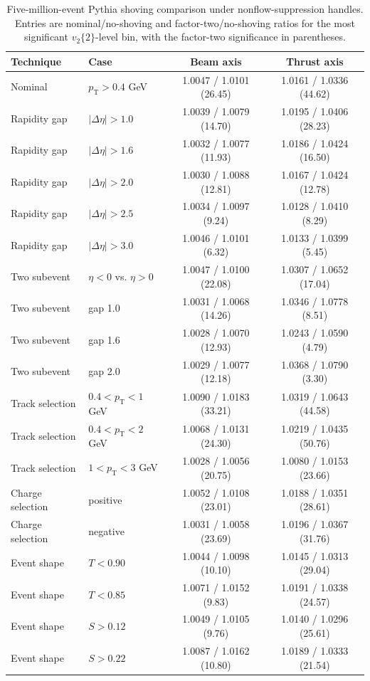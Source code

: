 \documentclass{article}
\newcommand{\pT}{\ensuremath{p_{\mathrm{T}}}}
\newcommand{\vn}[2]{\ensuremath{v_{#1}\{#2\}}}
\begin{document}
\begin{table}[htbp]
\centering
\scriptsize
\caption{Five-million-event Pythia shoving comparison under nonflow-suppression
handles. Entries are nominal/no-shoving and factor-two/no-shoving ratios for the
most significant \(\vn{2}{2}\)-level bin, with the factor-two significance in
parentheses.}
\label{tab:pythia-shoving-nonflow-v22}
\begin{tabular}{llcc}
\toprule
Technique & Case & Beam axis & Thrust axis \\
\midrule
Nominal & \(\pT>0.4\) GeV & 1.0047 / 1.0101 (26.45) & 1.0161 / 1.0336 (44.62) \\
Rapidity gap & \(|\Delta\eta|>1.0\) & 1.0039 / 1.0079 (14.70) & 1.0195 / 1.0406 (28.23) \\
Rapidity gap & \(|\Delta\eta|>1.6\) & 1.0032 / 1.0077 (11.93) & 1.0186 / 1.0424 (16.50) \\
Rapidity gap & \(|\Delta\eta|>2.0\) & 1.0030 / 1.0088 (12.81) & 1.0167 / 1.0424 (12.78) \\
Rapidity gap & \(|\Delta\eta|>2.5\) & 1.0034 / 1.0097 (9.24) & 1.0128 / 1.0410 (8.29) \\
Rapidity gap & \(|\Delta\eta|>3.0\) & 1.0046 / 1.0101 (6.32) & 1.0133 / 1.0399 (5.45) \\
Two subevent & \(\eta<0\) vs. \(\eta>0\) & 1.0047 / 1.0100 (22.08) & 1.0307 / 1.0652 (17.04) \\
Two subevent & gap 1.0 & 1.0031 / 1.0068 (14.26) & 1.0346 / 1.0778 (8.51) \\
Two subevent & gap 1.6 & 1.0028 / 1.0070 (12.93) & 1.0243 / 1.0590 (4.79) \\
Two subevent & gap 2.0 & 1.0029 / 1.0077 (12.18) & 1.0368 / 1.0790 (3.30) \\
Track selection & \(0.4<\pT<1\) GeV & 1.0090 / 1.0183 (33.21) & 1.0319 / 1.0643 (44.58) \\
Track selection & \(0.4<\pT<2\) GeV & 1.0068 / 1.0131 (24.30) & 1.0219 / 1.0435 (50.76) \\
Track selection & \(1<\pT<3\) GeV & 1.0028 / 1.0056 (20.75) & 1.0080 / 1.0153 (23.66) \\
Charge selection & positive & 1.0052 / 1.0108 (23.01) & 1.0188 / 1.0351 (28.61) \\
Charge selection & negative & 1.0031 / 1.0058 (23.69) & 1.0196 / 1.0367 (31.76) \\
Event shape & \(T<0.90\) & 1.0044 / 1.0098 (10.10) & 1.0145 / 1.0313 (29.04) \\
Event shape & \(T<0.85\) & 1.0071 / 1.0152 (9.83) & 1.0191 / 1.0338 (24.57) \\
Event shape & \(S>0.12\) & 1.0049 / 1.0105 (9.76) & 1.0140 / 1.0296 (25.61) \\
Event shape & \(S>0.22\) & 1.0087 / 1.0162 (10.80) & 1.0189 / 1.0333 (21.54) \\
\bottomrule
\end{tabular}
\end{table}
\end{document}
